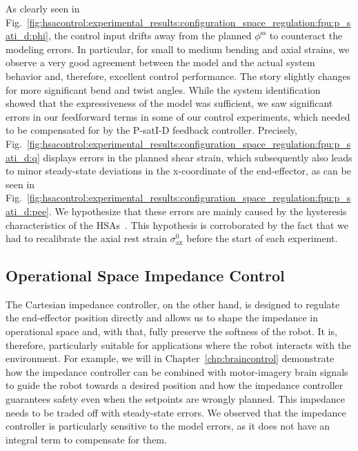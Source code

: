 As clearly seen in Fig.~\ref{fig:hsacontrol:experimental_results:configuration_space_regulation:fpu:p_sati_d:phi}, the control input drifts away from the planned $\phi^\mathrm{ss}$ to counteract the modeling errors.
In particular, for small to medium bending and axial strains, we observe a very good agreement between the model and the actual system behavior and, therefore, excellent control performance. 
The story slightly changes for more significant bend and twist angles. While the system identification showed that the expressiveness of the model was sufficient, we saw significant errors in our feedforward terms in some of our control experiments, which needed to be compensated for by the P-satI-D feedback controller. Precisely, Fig.~\ref{fig:hsacontrol:experimental_results:configuration_space_regulation:fpu:p_sati_d:q} displays errors in the planned shear strain, which subsequently also leads to minor steady-state deviations in the x-coordinate of the end-effector, as can be seen in Fig.~\ref{fig:hsacontrol:experimental_results:configuration_space_regulation:fpu:p_sati_d:pee}. We hypothesize that these errors are mainly caused by the hysteresis characteristics of the \glspl{HSA}~\citep{good2022expanding}. This hypothesis is corroborated by the fact that we had to recalibrate the axial rest strain $\sigma_\mathrm{ax}^0$ before the start of each experiment.

\subsection{Operational Space Impedance Control}
The Cartesian impedance controller, on the other hand, is designed to regulate the end-effector position directly and allows us to shape the impedance in operational space and, with that, fully preserve the softness of the robot.
It is, therefore, particularly suitable for applications where the robot interacts with the environment. For example, we will in Chapter~\ref{chp:braincontrol} demonstrate how the impedance controller can be combined with motor-imagery brain signals to guide the robot towards a desired position and how the impedance controller guarantees safety even when the setpoints are wrongly planned.
This impedance needs to be traded off with steady-state errors. We observed that the impedance controller is particularly sensitive to the model errors, as it does not have an integral term to compensate for them.
